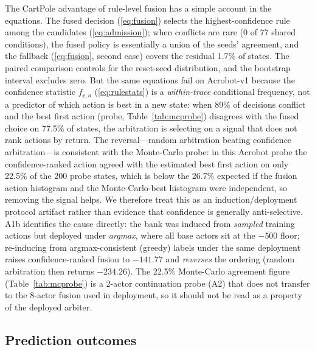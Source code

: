 \documentclass[11pt]{article}
\begin{document}
The CartPole advantage of rule-level fusion has a simple account in the equations. The fused
decision (\ref{eq:fusion}) selects the highest-confidence rule among the candidates
(\ref{eq:admission}); when conflicts are rare (0 of 77 shared conditions), the fused policy is
essentially a union of the seeds' agreement, and the fallback (\ref{eq:fusion}, second case) covers
the residual 1.7\% of states. The paired comparison controls for the reset-seed distribution, and
the bootstrap interval excludes zero. But the same equations fail on Acrobot-v1 because the
confidence statistic $f_{\mathbf{c},a}$ (\ref{eq:rulestats}) is a \emph{within-trace} conditional
frequency, not a predictor of which action is best in a new state: when 89\% of decisions conflict
and the best first action (probe, Table~\ref{tab:mcprobe}) disagrees with the fused choice on
77.5\% of states, the arbitration is selecting on a signal that does not rank actions by return.
The reversal---random arbitration beating confidence arbitration---is consistent with the
Monte-Carlo probe: in this Acrobot probe the confidence-ranked action agreed with the estimated best
first action on only 22.5\% of the 200 probe states, which is below the 26.7\% expected if the fusion
action histogram and the Monte-Carlo-best histogram were independent, so removing the signal helps.
We therefore treat this as an induction/deployment protocol artifact rather than evidence that
confidence is generally anti-selective. A1b identifies the cause directly: the bank was induced from
\emph{sampled} training actions but deployed under \emph{argmax}, where all base actors sit at the
$-500$ floor; re-inducing from argmax-consistent (greedy) labels under the same deployment raises
confidence-ranked fusion to $-141.77$ and \emph{reverses} the ordering (random arbitration then returns
$-234.26$). The 22.5\% Monte-Carlo agreement figure (Table~\ref{tab:mcprobe}) is a 2-actor continuation
probe (A2) that does not transfer to the 8-actor fusion used in deployment, so it should not be read as
a property of the deployed arbiter.

\subsection{Prediction outcomes}
\label{sec:discussion:predictions}
\end{document}
